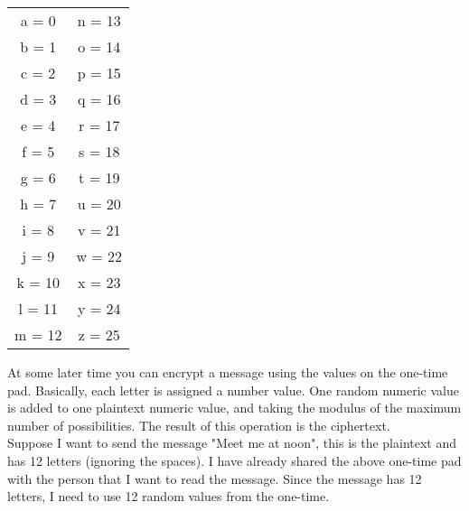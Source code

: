 \begin{center}
	
	\begin{tabular}{c | c }

		a = 0 & n = 13 \\
		b = 1 & o = 14 \\
		c = 2 & p = 15 \\
		d = 3 & q = 16 \\
		e = 4 & r = 17 \\
		f = 5 & s = 18 \\
		g = 6 & t = 19 \\
		h = 7 & u = 20 \\
		i = 8 & v = 21 \\
		j = 9 & w = 22 \\
		k = 10 & x = 23 \\
		l = 11 & y = 24 \\
		m = 12 & z = 25 \\
	\end{tabular}
\end{center}


At some later time you can encrypt a message using the values on the one-time pad. Basically, each letter is assigned a number value. One random numeric value is added to one plaintext numeric value, and taking the modulus of the maximum number of possibilities. The result of this operation is the ciphertext.\\

Suppose I want to send the message "Meet me at noon", this is the plaintext and has 12 letters (ignoring the spaces). I have already shared the above one-time pad with the person that I want to read the message. Since the message has 12 letters, I need to use 12 random values from the one-time.\\